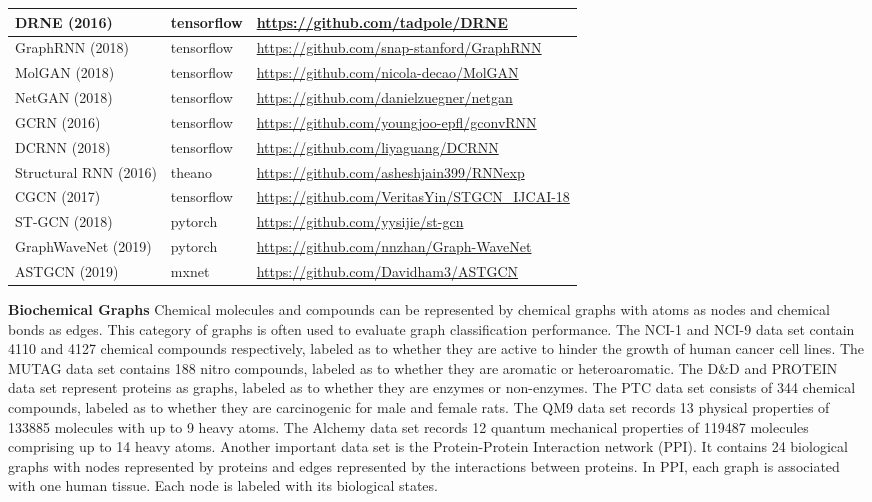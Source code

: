\begin{table}
\begin{tabular}{ l l l }
		DRNE (2016)        &      tensorflow       & \url{https://github.com/tadpole/DRNE}            \\ \hline
		GraphRNN (2018)      &    tensorflow         &    \url{https://github.com/snap-stanford/GraphRNN}         \\ \hline  
		MolGAN (2018) & tensorflow & \url{https://github.com/nicola-decao/MolGAN} \\ \hline
		NetGAN (2018) & tensorflow & \url{https://github.com/danielzuegner/netgan}  \\ \hline
		GCRN (2016)  & tensorflow & \url{https://github.com/youngjoo-epfl/gconvRNN} \\ \hline
		DCRNN (2018)     &     tensorflow        &      \url{https://github.com/liyaguang/DCRNN}        \\ \hline 
		Structural RNN (2016) &     theano        & \url{https://github.com/asheshjain399/RNNexp}            \\ \hline
		CGCN (2017)        &   tensorflow          &    \url{https://github.com/VeritasYin/STGCN_IJCAI-18}        \\ \hline 
		ST-GCN (2018)        & pytorch           &   \url{https://github.com/yysijie/st-gcn}          \\
		\hline
		GraphWaveNet (2019) & pytorch & \url{https://github.com/nnzhan/Graph-WaveNet} \\ \hline
		
		ASTGCN (2019)  & mxnet & \url{https://github.com/Davidham3/ASTGCN} \\ \bottomrule
	\end{tabular}
\end{table}
	

	
	\vspace{2mm}\noindent\textbf{Biochemical Graphs}
	Chemical molecules and compounds can be represented by chemical graphs with atoms as nodes and chemical bonds as edges.  This category of graphs is often used to evaluate graph classification performance.  The NCI-1 and NCI-9 data set contain 4110 and 4127 chemical compounds respectively, labeled as to whether they are active to hinder the growth of human cancer cell lines. The MUTAG data set contains 188 nitro compounds, labeled as to whether they are aromatic or heteroaromatic. The D\&D and PROTEIN data set represent proteins as graphs, labeled as to whether they are enzymes or non-enzymes.
	The PTC data set consists of 344 chemical compounds, labeled as to whether they are carcinogenic for male and female rats. 
	The QM9 data set records 13 physical properties of 133885 molecules with up to 9 heavy atoms. The Alchemy data set records 12 quantum mechanical properties of 119487 molecules comprising up to 14 heavy atoms. %
	Another important data set is the Protein-Protein Interaction network (PPI). It contains 24 biological graphs with nodes represented by proteins and edges represented by the interactions between proteins. In PPI, each graph is associated with one human tissue. Each node is labeled with its biological states.
	
